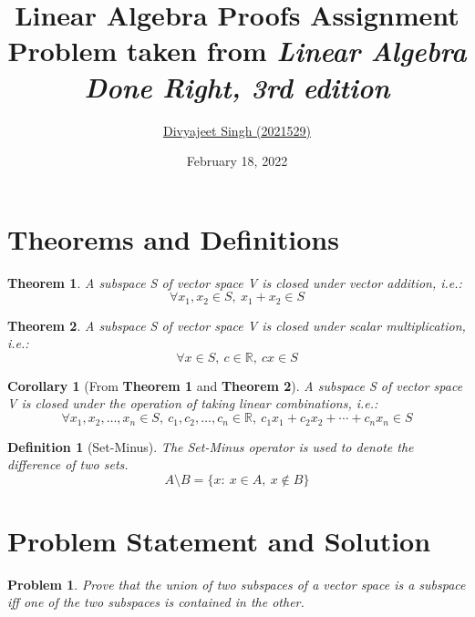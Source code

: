 \documentclass{article}
\title{
    {\huge Linear Algebra Proofs Assignment} \\
    {\large Problem taken from \textit{Linear Algebra Done Right, 3rd edition}} \\
}
\author{\href{mailto:divyajeet21529@iiitd.ac.in}{Divyajeet Singh (2021529)}}
\date{February 18, 2022}
\newtheorem{theorem}{Theorem}
\newtheorem{corollary}{Corollary}
\newtheorem{definition}{Definition}
\newtheorem{problem}{Problem}
\newcommand{\R}{\mathbb{R}}
\newcommand{\diff}[2]{#1 \setminus #2}
\begin{document}
\maketitle

\section{Theorems and Definitions}
    \begin{theorem}
        A subspace S of vector space V is closed under vector addition, i.e.:
        \begin{equation}
            \label{addition} \forall x_1, x_2 \in S,\ x_1 + x_2 \in S
        \end{equation}
    \end{theorem}

    \begin{theorem}
        A subspace S of vector space V is closed under scalar multiplication, i.e.:
        \begin{equation}
            \label{multiplication} \forall x \in S,\ c \in \R,\ cx \in S
        \end{equation}
    \end{theorem}

    \begin{corollary}[From \textbf{Theorem 1} and \textbf{Theorem 2}]
        A subspace S of vector space V is closed under the operation of taking linear combinations, i.e.:
        \begin{equation}
            \label{LC}
            \forall x_1, x_2, \ldots, x_n \in S,\ c_1, c_2, \ldots, c_n \in \R,\ c_1x_1 + c_2x_2 + \cdots + c_nx_n \in S
        \end{equation}
    \end{corollary}

    \begin{definition}[Set-Minus]
        The Set-Minus operator is used to denote the difference of two sets.
        \begin{equation}
            \label{set-minus} \diff{A}{B} = \{ x :\ x \in A,\ x \notin B \}
        \end{equation}
    \end{definition}

\pagebreak

\section{Problem Statement and Solution}
    \begin{problem}
        Prove that the union of two subspaces of a vector space is a subspace iff one of the two subspaces is contained in the other.
    \end{problem}
\end{document}
